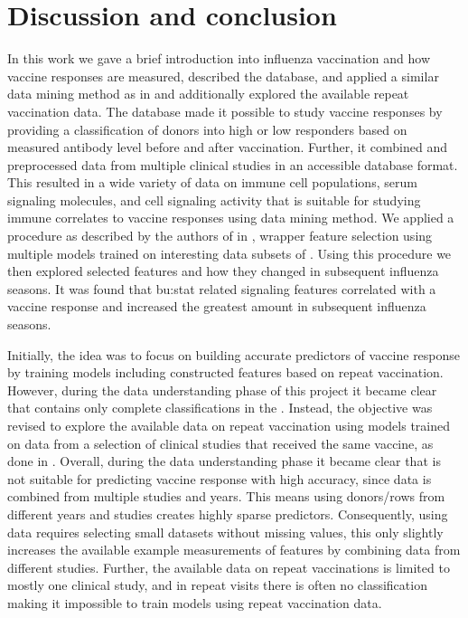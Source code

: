 \section{Discussion and conclusion}

In this work we gave a brief introduction into influenza vaccination and how vaccine responses are measured, described the \flup database, and applied a similar data mining method as in \spaper and additionally explored the available repeat vaccination data.
The \flup database made it possible to study vaccine responses by providing a classification of donors into high or low responders based on measured antibody level before and after vaccination.
Further, it combined and preprocessed data from multiple clinical studies in an accessible database format.
This resulted in a wide variety of data on immune cell populations, serum signaling molecules, and cell signaling activity that is suitable for studying immune correlates to vaccine responses using data mining method.
We applied a procedure as described by the authors of \flup in \spaper, wrapper feature selection using multiple models trained on interesting data subsets of \flup. Using this procedure we then explored selected features and how they changed in subsequent influenza seasons.
It was found that \gls{bu:stat} related signaling features correlated with a vaccine response and increased the greatest amount in subsequent influenza seasons.

Initially, the idea was to focus on building accurate predictors of vaccine response by training models including constructed features based on repeat vaccination. However, during the data understanding phase of this project it became clear that \flup contains only complete classifications in the \firstvis.
Instead, the objective was revised to explore the available data on repeat vaccination using models trained on \firstvis data from a selection of clinical studies that received the same vaccine, as done in \spaper.
Overall, during the data understanding phase it became clear that \flup is not suitable for predicting vaccine response with high accuracy, since data is combined from multiple studies and years.
This means using donors/rows from different years and studies creates highly sparse predictors.
Consequently, using \flup data requires selecting small datasets without missing values, this only slightly increases the available example measurements of features by combining data from different studies.
Further, the available data on repeat vaccinations is limited to mostly one clinical study, and in repeat visits there is often no classification making it impossible to train models using repeat vaccination data.

